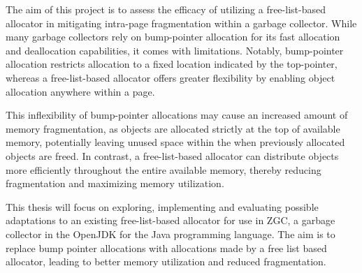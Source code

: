 
The aim of this project is to assess the efficacy of utilizing a free-list-based allocator in mitigating intra-page fragmentation within a garbage collector. While many garbage collectors rely on bump-pointer allocation for its fast allocation and deallocation capabilities, it comes with limitations. Notably, bump-pointer allocation restricts allocation to a fixed location indicated by the top-pointer, whereas a free-list-based allocator offers greater flexibility by enabling object allocation anywhere within a page.

This inflexibility of bump-pointer allocations may cause an increased amount of memory fragmentation, as objects are allocated strictly at the top of available memory, potentially leaving unused space within the when previously allocated objects are freed. In contrast, a free-list-based allocator can distribute objects more efficiently throughout the entire available memory, thereby reducing fragmentation and maximizing memory utilization.

This thesis will focus on exploring, implementing and evaluating possible adaptations to an existing free-list-based allocator for use in ZGC, a garbage collector in the OpenJDK for the Java programming language. The aim is to replace bump pointer allocations with allocations made by a free list based allocator, leading to better memory utilization and reduced fragmentation.

